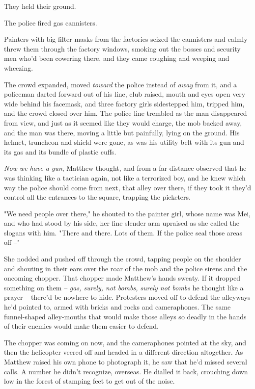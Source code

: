 They held their ground.

The police fired gas cannisters.

Painters with big filter masks from the factories seized the
cannisters and calmly threw them through the factory windows,
smoking out the bosses and security men who'd been cowering there,
and they came coughing and weeping and wheezing.

The crowd expanded, moved \emph{toward} the police instead of
\emph{away} from it, and a policeman darted forward out of his
line, club raised, mouth and eyes open very wide behind his
facemask, and three factory girls sidestepped him, tripped him, and
the crowd closed over him. The police line trembled as the man
disappeared from view, and just as it seemed like they would
charge, the mob backed away, and the man was there, moving a little
but painfully, lying on the ground. His helmet, truncheon and
shield were gone, as was his utility belt with its gun and its gas
and its bundle of plastic cuffs.

\emph{Now we have a gun}, Matthew thought, and from a far distance
observed that he was thinking like a tactician again, not like a
terrorized boy, and he knew which way the police should come from
next, that alley over there, if they took it they'd control all the
entrances to the square, trapping the picketers.

"We need people over there," he shouted to the painter girl, whose
name was Mei, and who had stood by his side, her fine slender arm
upraised as she called the slogans with him. "There and there. Lots
of them. If the police seal those areas off --"

She nodded and pushed off through the crowd, tapping people on the
shoulder and shouting in their ears over the roar of the mob and
the police sirens and the oncoming chopper. That chopper made
Matthew's hands sweaty. If it dropped something on them --
\emph{gas, surely, not bombs, surely not bombs} he thought like a
prayer -- there'd be nowhere to hide. Protesters moved off to
defend the alleyways he'd pointed to, armed with bricks and rocks
and cameraphones. The same funnel-shaped alley-mouths that would
make those alleys so deadly in the hands of their enemies would
make them easier to defend.

The chopper was coming on now, and the cameraphones pointed at the
sky, and then the helicopter veered off and headed in a different
direction altogether. As Matthew raised his own phone to photograph
it, he saw that he'd missed several calls. A number he didn't
recognize, overseas. He dialled it back, crouching down low in the
forest of stamping feet to get out of the noise.

